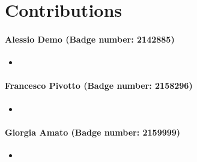 \section{Contributions}
\label{sec:contributions}

\paragraph{\textbf{Alessio Demo (Badge number: 2142885)}}
\begin{itemize}[leftmargin=*]
    \item %
\end{itemize}

\paragraph{\textbf{Francesco Pivotto (Badge number: 2158296)}}
\begin{itemize}[leftmargin=*]
    \item %
\end{itemize}

\paragraph{\textbf{Giorgia Amato (Badge number: 2159999)}}
\begin{itemize}[leftmargin=*]
    \item %
\end{itemize}